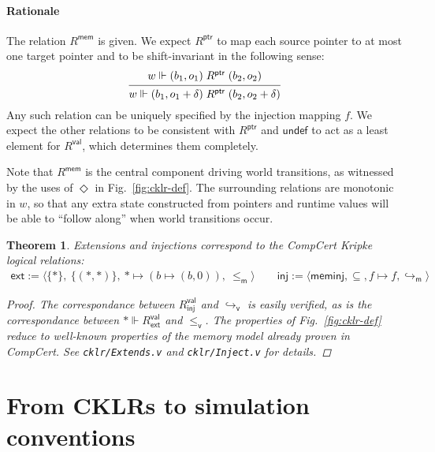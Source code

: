 \documentclass[draft,11pt]{report}
\newtheorem{theorem}{Theorem}
\newcommand{\kw}[1]{\ensuremath{ \mathsf{#1} }}
\newcommand{\vref}{\le_\kw{v}}   %
\newcommand{\mext}{\le_\kw{m}}   %
\begin{document}
\paragraph{Rationale} %

The relation $R^\kw{mem}$ is given.
We expect $R^\kw{ptr}$ to map
each source pointer to at most one target pointer
and to be shift-invariant in the following sense:
\[
  \begin{prooftree}
    \hypo{w \Vdash (b_1, o_1) \mathrel{R^\kw{ptr}} (b_2, o_2)}
    \infer1{
      w \Vdash (b_1, o_1 + \delta) \mathrel{R^\kw{ptr}} (b_2, o_2 + \delta)}
  \end{prooftree}
\]
Any such relation can be uniquely specified by
the injection mapping $f$.
We expect the other relations to be consistent with $R^\kw{ptr}$
and $\kw{undef}$ to act as a least element for $R^\kw{val}$,
which determines them completely.


Note that $R^\kw{mem}$
is the central component driving world transitions,
as witnessed by the uses of $\Diamond$ in Fig.~\ref{fig:cklr-def}.
The surrounding relations are monotonic in $w$,
so that any extra state
constructed from pointers and runtime values
will be able to ``follow along'' when
world transitions occur.

\begin{theorem}
Extensions and injections
correspond to the CompCert Kripke logical relations:
\begin{align*}
  \kw{ext} :=
    \langle \{*\}, \: \{(*,*)\}, \: * \mapsto (b \mapsto (b, 0)), \:
    {\mext} \rangle
  \qquad
  \kw{inj} :=
    \langle \kw{meminj}, {\subseteq}, f \mapsto f,
      {\hookrightarrow_\kw{m}} \rangle
\end{align*}
\begin{proof}
The correspondance between $R^\kw{val}_\kw{inj}$ and
$\hookrightarrow_\kw{v}$ is easily verified,
as is the correspondance between
$* \Vdash R^\kw{val}_\kw{ext}$ and $\vref$.
The properties of Fig.~\ref{fig:cklr-def}
reduce to well-known properties of the memory model
already proven in CompCert.
See \texttt{cklr/Extends.v} and \texttt{cklr/Inject.v}
for details.
\end{proof}
\end{theorem}


\section{From CKLRs to simulation conventions} \label{sec:cklrsc} %
\end{document}
